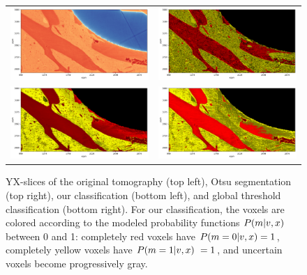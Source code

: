 \begin{figure}
    \centering
    \begin{tabular}{cc}
        \includegraphics[width=.45\linewidth]{generated/770c_pag_segmented_yx_raw.pdf} &
        \includegraphics[width=.45\linewidth]{generated/770c_pag_global_yx_otsu.pdf}
        \\
        \includegraphics[width=.45\linewidth]{generated/770c_pag_segmented_yx_colored.pdf} &
        \includegraphics[width=.45\linewidth]{generated/770c_pag_global_yx.pdf} \\
    \end{tabular}
    \caption{
	YX-slices of the original tomography (top left), Otsu segmentation (top
	right), our classification (bottom left), and global threshold
	classification (bottom right).  For our classification, the voxels are
	colored according to the modeled probability functions $P(m\vert
	v,x)$ between 0 and 1: completely red voxels have $P(m=0\vert
	v,x) = 1$, completely yellow voxels have $P(m=1\vert v,x)\ =
	1$, and uncertain voxels become progressively gray.
    }
    \label{fig:histology-comparison1}
\end{figure}

